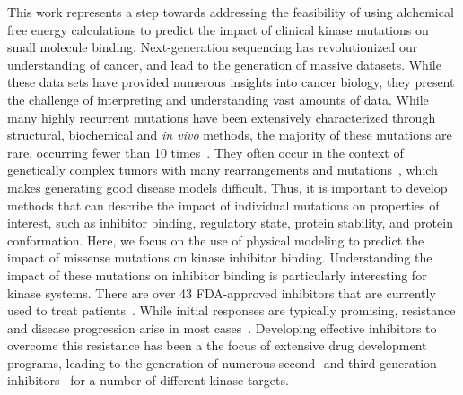 \documentclass[phd,tocprelim]{cornell}
\begin{document}
\medskip
This work represents a step towards addressing the feasibility of using alchemical free energy calculations to predict the impact of clinical kinase mutations on small molecule binding. Next-generation sequencing has revolutionized our understanding of cancer, and lead to the generation of massive datasets. While these data sets have provided numerous insights into cancer biology, they present the challenge of interpreting and understanding vast amounts of data. While many highly recurrent mutations have been extensively characterized through structural, biochemical and \emph{in vivo} methods, the majority of these mutations are rare, occurring fewer than 10 times~\citep{Hauser:2018vz}. They often occur in the context of genetically complex tumors with many rearrangements and mutations~\citep{Zehir:2017ib}, which makes generating good disease models difficult.  Thus, it is important to develop methods that can describe the impact of individual mutations on properties of interest, such as inhibitor binding, regulatory state, protein stability, and protein conformation. Here, we focus on the use of physical modeling to predict the impact of missense mutations on kinase inhibitor binding. Understanding the impact of these mutations on inhibitor binding is particularly interesting for kinase systems. There are over 43 FDA-approved inhibitors that are currently used to treat patients~\citep{fda-approved-kinase-inhibitors}. While initial responses are typically promising, resistance and disease progression arise in most cases~\citep{knight-shokat:2005:chem-biol:selective-kinase-inhibitors,Pao:2005dp,Pao2004-kx}. Developing effective inhibitors to overcome this resistance has been a the focus of extensive drug development programs, leading to the generation of numerous second- and third-generation inhibitors~\citep{Chuang:2016jw,Tan:2018de,Gainor:2016ep} for a number of different kinase targets. 
\end{document}
